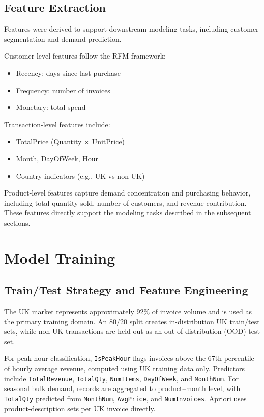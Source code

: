 \documentclass[10pt,a4paper]{article}
\begin{document}
\subsection{Feature Extraction}

Features were derived to support downstream modeling tasks, including customer segmentation and demand prediction.

Customer-level features follow the RFM framework:
\begin{itemize}
\item Recency: days since last purchase
\item Frequency: number of invoices
\item Monetary: total spend
\end{itemize}

Transaction-level features include:
\begin{itemize}
\item TotalPrice (Quantity $\times$ UnitPrice)
\item Month, DayOfWeek, Hour
\item Country indicators (e.g., UK vs non-UK)
\end{itemize}

Product-level features capture demand concentration and purchasing behavior, including total quantity sold, number of customers, and revenue contribution. These features directly support the modeling tasks described in the subsequent sections.


\section{Model Training}

\subsection{Train/Test Strategy and Feature Engineering}
The UK market represents approximately 92\% of invoice volume and is used as the primary training domain. An 80/20 split creates in-distribution UK train/test sets, while non-UK transactions are held out as an out-of-distribution (OOD) test set.

For peak-hour classification, \texttt{IsPeakHour} flags invoices above the 67th percentile of hourly average revenue, computed using UK training data only. Predictors include \texttt{TotalRevenue}, \texttt{TotalQty}, \texttt{NumItems}, \texttt{DayOfWeek}, and \texttt{MonthNum}. For seasonal bulk demand, records are aggregated to product--month level, with \texttt{TotalQty} predicted from \texttt{MonthNum}, \texttt{AvgPrice}, and \texttt{NumInvoices}. Apriori uses product-description sets per UK invoice directly.
\end{document}
